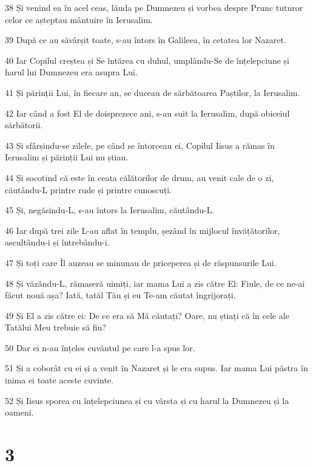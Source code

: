 \par 38 Și venind ea în acel ceas, lăuda pe Dumnezeu și vorbea despre Prunc tuturor celor ce așteptau mântuire în Ierusalim.
\par 39 După ce au săvârșit toate, s-au întors în Galileea, în cetatea lor Nazaret.
\par 40 Iar Copilul creștea și Se întărea cu duhul, umplându-Se de înțelepciune și harul lui Dumnezeu era asupra Lui.
\par 41 Și părinții Lui, în fiecare an, se duceau de sărbătoarea Paștilor, la Ierusalim.
\par 42 Iar când a fost El de doisprezece ani, s-au suit la Ierusalim, după obiceiul sărbătorii.
\par 43 Și sfârșindu-se zilele, pe când se întorceau ei, Copilul Iisus a rămas în Ierusalim și părinții Lui nu știau.
\par 44 Și socotind că este în ceata călătorilor de drum, au venit cale de o zi, căutându-L printre rude și printre cunoscuți.
\par 45 Și, negăsindu-L, s-au întors la Ierusalim, căutându-L.
\par 46 Iar după trei zile L-au aflat în templu, șezând în mijlocul învățătorilor, ascultându-i și întrebându-i.
\par 47 Și toți care Îl auzeau se minunau de priceperea și de răspunsurile Lui.
\par 48 Și văzându-L, rămaseră uimiți, iar mama Lui a zis către El: Fiule, de ce ne-ai făcut nouă așa? Iată, tatăl Tău și eu Te-am căutat îngrijorați.
\par 49 Și El a zis către ei: De ce era să Mă căutați? Oare, nu știați că în cele ale Tatălui Meu trebuie să fiu?
\par 50 Dar ei n-au înțeles cuvântul pe care l-a spus lor.
\par 51 Și a coborât cu ei și a venit în Nazaret și le era supus. Iar mama Lui păstra în inima ei toate aceste cuvinte.
\par 52 Și Iisus sporea cu înțelepciunea și cu vârsta și cu harul la Dumnezeu și la oameni.

\chapter{3}

